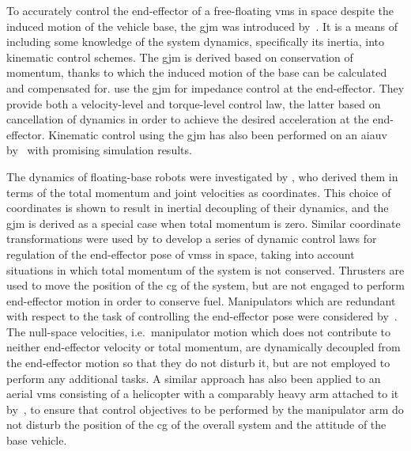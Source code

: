 \documentclass[../main.tex]{subfiles}
\begin{document}
To accurately control the end-effector of a free-floating \gls{vms} in space despite the induced motion of the vehicle base, the \gls{gjm} was introduced by~\cite{Umetani1989}. It is a means of including some knowledge of the system dynamics, specifically its inertia, into kinematic control schemes. The \gls{gjm} is derived based on conservation of momentum, thanks to which the induced motion of the base can be calculated and compensated for. \cite{Nakanishi2006} use the \gls{gjm} for impedance control at the end-effector. They provide both a velocity-level and torque-level control law, the latter based on cancellation of dynamics in order to achieve the desired acceleration at the end-effector. Kinematic control using the \gls{gjm} has also been performed on an \gls{aiauv} by~\cite{Amundsen2018} with promising simulation results.

The dynamics of floating-base robots were investigated by \cite{Garofalo2015}, who derived them in terms of the total momentum and joint velocities as coordinates. %
This choice of coordinates is shown to result in inertial decoupling of their dynamics, and the \gls{gjm} is derived as a special case when total momentum is zero. %
Similar coordinate transformations were used by \cite{Giordano2016,Giordano2018} to develop a series of dynamic control laws for regulation of the end-effector pose of \glspl{vms} in space, taking into account situations in which total momentum of the system is not conserved. Thrusters are used to move the position of the \gls{cg} of the system, but are not engaged to perform end-effector motion in order to conserve fuel. Manipulators which are redundant with respect to the task of controlling the end-effector pose were considered by~\cite{Giordano2016}. The null-space velocities, i.e.~manipulator motion which does not contribute to neither end-effector velocity or total momentum, are dynamically decoupled from the end-effector motion so that they do not disturb it, but are not employed to perform any additional tasks. A similar approach has also been applied to an aerial \gls{vms} consisting of a helicopter with a comparably heavy arm attached to it by~\cite{Garofalo2018}, to ensure that control objectives to be performed by the manipulator arm do not disturb the position of the \gls{cg} of the overall system and the attitude of the base vehicle.%
\end{document}
